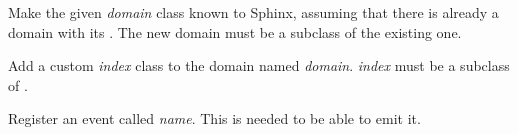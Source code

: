 \documentclass[letterpaper,10pt,english]{sphinxmanual}
\begin{document}
\begin{fulllineitems}
\label{ext/appapi:sphinx.application.Sphinx.override_domain}
Make the given \emph{domain} class known to Sphinx, assuming that there is already
a domain with its .  The new domain must be a subclass of the
existing one.


\end{fulllineitems}


\begin{fulllineitems}
\label{ext/appapi:sphinx.application.Sphinx.add_index_to_domain}
Add a custom \emph{index} class to the domain named \emph{domain}.  \emph{index} must be a
subclass of .


\end{fulllineitems}


\begin{fulllineitems}
\label{ext/appapi:sphinx.application.Sphinx.add_event}
Register an event called \emph{name}.  This is needed to be able to emit it.

\end{fulllineitems}

\end{document}
